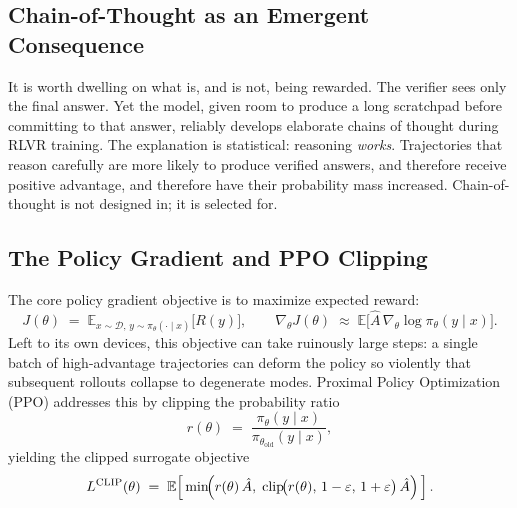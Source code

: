 \documentclass[11pt,a4paper]{article}
\theoremstyle{definition}
\theoremstyle{plain}
\newcommand{\E}{\mathbb{E}}
\begin{document}
\subsection{Chain-of-Thought as an Emergent Consequence}

It is worth dwelling on what is, and is not, being rewarded. The verifier sees only the final answer. Yet the model, given room to produce a long scratchpad before committing to that answer, reliably develops elaborate chains of thought during RLVR training. The explanation is statistical: reasoning \emph{works}. Trajectories that reason carefully are more likely to produce verified answers, and therefore receive positive advantage, and therefore have their probability mass increased. Chain-of-thought is not designed in; it is selected for.

\subsection{The Policy Gradient and PPO Clipping}

The core policy gradient objective is to maximize expected reward:
\begin{equation}
  J(\theta) \;=\; \E_{x \sim \mathcal{D},\, y \sim \pi_\theta(\cdot \mid x)}\bigl[R(y)\bigr],
  \qquad
  \nabla_\theta J(\theta) \;\approx\; \E\bigl[\hat{A}\,\nabla_\theta \log \pi_\theta(y \mid x)\bigr].
\end{equation}
Left to its own devices, this objective can take ruinously large steps: a single batch of high-advantage trajectories can deform the policy so violently that subsequent rollouts collapse to degenerate modes. Proximal Policy Optimization (PPO) addresses this by clipping the probability ratio
\begin{equation}
  r(\theta) \;=\; \frac{\pi_\theta(y \mid x)}{\pi_{\theta_{\text{old}}}(y \mid x)},
\end{equation}
yielding the clipped surrogate objective
\begin{equation}
  L^{\text{CLIP}}(\theta) \;=\; \E\!\left[\,\min\!\Bigl(r(\theta)\,\hat{A},\;\operatorname{clip}\!\bigl(r(\theta),\,1-\varepsilon,\,1+\varepsilon\bigr)\,\hat{A}\Bigr)\,\right].
\end{equation}
\end{document}
